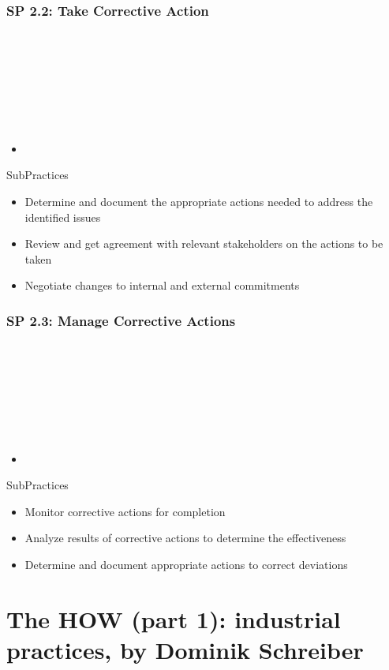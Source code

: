 \documentclass[accentcolor=tud1b]{tudbeamer}
\newcommand{\strong}[1]{\textaccentcolor{\textsf{\textbf{#1}}}}
\newenvironment*{tframe}[1][]{%
	\begin{frame}
	\ifnum\Level=2
		\frametitle{\insertsectionhead\\\strong{#1}}
	\fi\ifnum\Level=3
		\frametitle{\insertsectionhead\\\strong{\insertsubsectionhead} \textnormal{#1}}
	\fi\ifnum\Level=4
		\frametitle{\insertsubsectionhead\\\strong{\insertsubsubsectionhead} #1}
	\fi
}{%
	\end{frame}
}
\begin{document}
\subsubsection{SP 2.2: Take Corrective Action}
\begin{tframe}
	\begin{itemize}
		\item 
	\end{itemize}
	\begin{block}{SubPractices}
		\begin{itemize}
		  \item Determine and document the appropriate actions needed to address the identified issues
		  \item Review and get agreement with relevant stakeholders on the actions to be taken
		  \item Negotiate changes to internal and external commitments
		\end{itemize}
	\end{block}
\end{tframe}

\subsubsection{SP 2.3: Manage Corrective Actions}
\begin{tframe}
	\begin{itemize}
		\item 
	\end{itemize}
	\begin{block}{SubPractices}
		\begin{itemize}
		  \item Monitor corrective actions for completion
		  \item Analyze results of corrective actions to determine the effectiveness
		  \item Determine and document appropriate actions to correct deviations
		\end{itemize}
	\end{block}
\end{tframe}

\section[industrial practices]{The HOW (part 1): industrial practices, by Dominik Schreiber}
\begin{tframe}
	
\cite{alegria2006cmmiagile}

\end{tframe}
\end{document}
